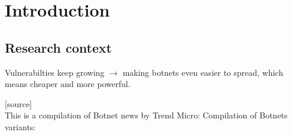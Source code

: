 
\chapter{Introduction} %

\label{Introduction} %


\newcommand{\keyword}[1]{\textbf{#1}}
\newcommand{\tabhead}[1]{\textbf{#1}}
\newcommand{\code}[1]{\texttt{#1}}
\newcommand{\file}[1]{\texttt{\bfseries#1}}
\newcommand{\option}[1]{\texttt{\itshape#1}}

\section{Research context}
Vulnerabilties keep growing $\rightarrow$ making botnets even easier to spread, which means cheaper and more powerful.

[source]\\
This is a compilation of Botnet news by Trend Micro: %
Compilation of Botnets variants: %
